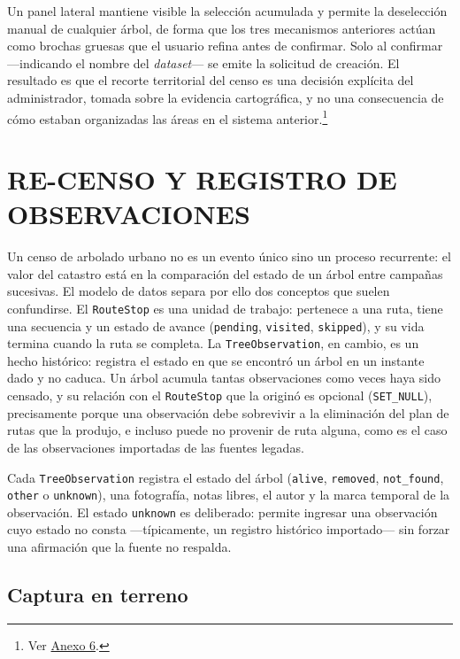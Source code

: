 Un panel lateral mantiene visible la selección acumulada y permite la deselección manual de
cualquier árbol, de forma que los tres mecanismos anteriores actúan como brochas gruesas que el
usuario refina antes de confirmar. Solo al confirmar ---indicando el nombre del \textit{dataset}---
se emite la solicitud de creación. El resultado es que el recorte territorial del censo es una
decisión explícita del administrador, tomada sobre la evidencia cartográfica, y no una consecuencia
de cómo estaban organizadas las áreas en el sistema anterior.\footnote{Ver
\hyperref[anx:capturas]{Anexo 6}.}

\section{RE-CENSO Y REGISTRO DE OBSERVACIONES}
\label{sec:recenso}

Un censo de arbolado urbano no es un evento único sino un proceso recurrente: el valor del catastro
está en la comparación del estado de un árbol entre campañas sucesivas. El modelo de datos separa
por ello dos conceptos que suelen confundirse. El \texttt{RouteStop} es una unidad de trabajo:
pertenece a una ruta, tiene una secuencia y un estado de avance (\texttt{pending}, \texttt{visited},
\texttt{skipped}), y su vida termina cuando la ruta se completa. La \texttt{TreeObservation}, en
cambio, es un hecho histórico: registra el estado en que se encontró un árbol en un instante dado y
no caduca. Un árbol acumula tantas observaciones como veces haya sido censado, y su relación con el
\texttt{RouteStop} que la originó es opcional (\texttt{SET\_NULL}), precisamente porque una
observación debe sobrevivir a la eliminación del plan de rutas que la produjo, e incluso puede no
provenir de ruta alguna, como es el caso de las observaciones importadas de las fuentes legadas.

Cada \texttt{TreeObservation} registra el estado del árbol (\texttt{alive}, \texttt{removed},
\texttt{not\_found}, \texttt{other} o \texttt{unknown}), una fotografía, notas libres, el autor y la
marca temporal de la observación. El estado \texttt{unknown} es deliberado: permite ingresar una
observación cuyo estado no consta ---típicamente, un registro histórico importado--- sin forzar una
afirmación que la fuente no respalda.

\subsection{Captura en terreno}

